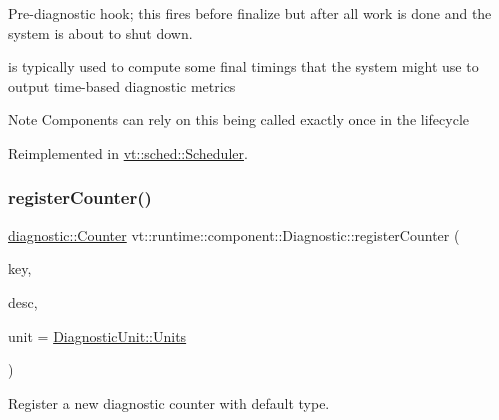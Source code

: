 Pre-\/diagnostic hook; this fires before finalize but after all work is done and the system is about to shut down. 

is typically used to compute some final timings that the system might use to output time-\/based diagnostic metrics

\begin{DoxyNote}{Note}
Components can rely on this being called exactly once in the lifecycle 
\end{DoxyNote}


Reimplemented in \hyperlink{structvt_1_1sched_1_1_scheduler_a42835a58f541dd65cecd4d393fe78a81}{vt\+::sched\+::\+Scheduler}.

\mbox{\label{structvt_1_1runtime_1_1component_1_1_diagnostic_aa2cd54632710e7cdf1b20dfb676c752c}} 
\subsubsection{\texorpdfstring{register\+Counter()}{registerCounter()}}
{\footnotesize\ttfamily \hyperlink{namespacevt_1_1diagnostic_a55fcc9d6ffa285d1b085c01df2507d2f}{diagnostic\+::\+Counter} vt\+::runtime\+::component\+::\+Diagnostic\+::register\+Counter (\begin{DoxyParamCaption}\item[{std\+::string const \&}]{key,  }\item[{std\+::string const \&}]{desc,  }\item[{\hyperlink{namespacevt_1_1runtime_1_1component_a99ec18b08862c712176126bb7d0e307a}{Diagnostic\+Unit}}]{unit = {\ttfamily \hyperlink{namespacevt_1_1runtime_1_1component_a99ec18b08862c712176126bb7d0e307aae5771a362d88a71a657bfcd21ca54b3f}{Diagnostic\+Unit\+::\+Units}} }\end{DoxyParamCaption})\hspace{0.3cm}{\ttfamily [protected]}}



Register a new diagnostic counter with default type. 


